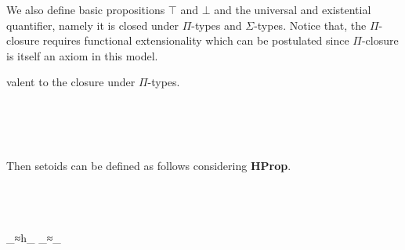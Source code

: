 We also define basic propositions $\top$ and $\bot$ and the universal and existential quantifier, namely it is closed under $\Pi$-types and $\Sigma$-types. Notice that, the $\Pi$-closure requires functional extensionality which can be postulated since $\Pi$-closure is itself an axiom in this model.

valent to the closure under $\Pi$-types.

\begin{code}\>\<
%
\\
\> \AgdaSymbol{:} \AgdaSymbol{(} \AgdaSymbol{:} \AgdaSymbol{)(} \AgdaSymbol{:}   \AgdaSymbol{)}  \<%
\\
\>   \AgdaSymbol{=}  \AgdaSymbol{((} \AgdaSymbol{:} \AgdaSymbol{)}  \AgdaFunction{<}   \AgdaFunction{>}\AgdaSymbol{)} \AgdaSymbol{(}     \AgdaSymbol{(} \AgdaSymbol{)))}\<%
\\
\>\<\end{code}

Then setoids can be defined as follows considering \textbf{HProp}.

\begin{code}\>\<%
\\
\>  \AgdaSymbol{:}  \<%
\\
\>[0]\<[2]%
\>[2] \AgdaInductiveConstructor{\_,\_,\_}\<%
\\
\>[0]\<[2]%
\>[2]  \_≈h\_ \_≈\_\<%
\\
\>[0]\<[2]%
\>[2]\<%
\\
\>[2]\<[4]%
\>[4] \AgdaSymbol{:} \<%
\\
\>[2]\<[4]%
\>[4] \<[12]%
\>[12]\AgdaSymbol{:}     \<%
\\
\>[2]\<[4]%
\>[4] \AgdaSymbol{:}  \<%
\\
%
\\
%
\\
\>\<\end{code}


